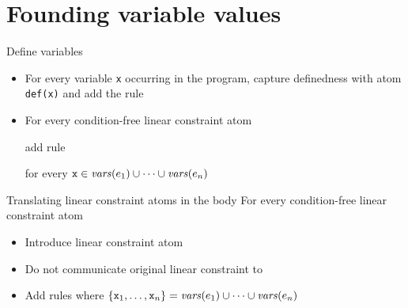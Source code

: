 \documentclass[11pt]{beamer}
\begin{document}
\section{Founding variable values}

\begin{frame}{Define variables}
  \begin{itemize}
    \item For every variable \texttt{x} occurring in the program, capture definedness with atom \texttt{def(x)} and add the rule

    \pause
    \item For every condition-free linear constraint atom 
    
       add rule
       
       for every $\mathtt{x} \in \mathit{vars}(e_1)\cup\dots\cup\mathit{vars}(e_n)$
   \end{itemize}
\end{frame}

\begin{frame}{Translating linear constraint atoms in the body}
  For every condition-free linear constraint atom 
     
    \pause
    \begin{itemize}
      \item  Introduce linear constraint atom  
            
            \pause
      \item Do not communicate original linear constraint to \clingcon\ \pause 
      \item Add rules
      \only<4>{}
      where $\{\mathtt{x}_1,\dots,\mathtt{x}_n\}=\mathit{vars}(e_1)\cup\dots\cup\mathit{vars}(e_n)$
    \end{itemize}
\end{frame}
\end{document}
